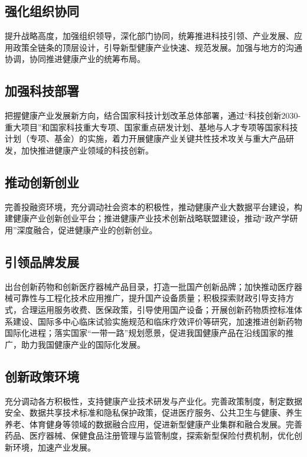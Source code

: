 \documentclass{article}
\begin{document}
\subsection{强化组织协同}

提升战略高度，加强组织领导，深化部门协同，统筹推进科技引领、产业发展、应用政策全链条的顶层设计，引导新型健康产业快速、规范发展。加强与地方的沟通协调，协同推进健康产业的统筹布局。

\subsection{加强科技部署}

把握健康产业发展新方向，结合国家科技计划改革总体部署，通过“科技创新2030-重大项目”和国家科技重大专项、国家重点研发计划、基地与人才专项等国家科技计划（专项、基金）的实施，着力开展健康产业关键共性技术攻关与重大产品研发，加快推进健康产业领域的科技创新。

\subsection{推动创新创业}

完善投融资环境，充分调动社会资本的积极性，推动健康产业大数据平台建设，构建健康产业创新创业平台；推进健康产业技术创新战略联盟建设，推动“政产学研用”深度融合，促进健康产业的创新创业。

\subsection{引领品牌发展}

出台创新药物和创新医疗器械产品目录，打造一批国产创新品牌；加快推动医疗器械可靠性与工程化技术应用推广，提升国产设备质量；积极探索财政引导支持方式，合理运用服务收费、医保政策，引导使用国产设备；开展创新药物质控标准体系建设、国际多中心临床试验实施规范和临床疗效评价等研究，加速推进创新药物国际化进程；落实国家“一带一路”规划愿景，促进我国健康产品在沿线国家的推广，助力我国健康产业的国际化发展。

\subsection{创新政策环境}

充分调动各方积极性，支持健康产业技术研发与产业化。完善政策制度，制定数据安全、数据共享技术标准和隐私保护政策，促进医疗服务、公共卫生与健康、养生养老、体育健身等领域的数据融合应用，促进新型健康产业集群和融合发展。完善药品、医疗器械、保健食品注册管理与监管制度，探索新型保险付费机制，优化创新环境，加速产业发展。
\end{document}

